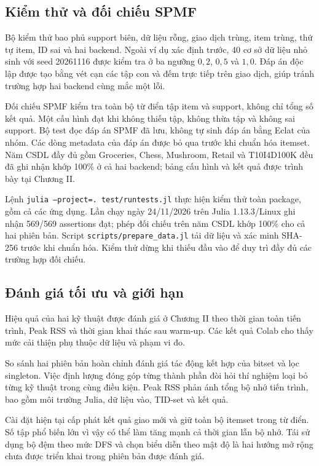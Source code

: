 \subsection{Kiểm thử và đối chiếu SPMF}
Bộ kiểm thử bao phủ support biên, dữ liệu rỗng, giao dịch trùng, item trùng, thứ tự item, ID sai và hai backend. Ngoài ví dụ xác định trước, 40 cơ sở dữ liệu nhỏ sinh với seed 20261116 được kiểm tra ở ba ngưỡng $0{,}2$, $0{,}5$ và $1{,}0$. Đáp án độc lập được tạo bằng vét cạn các tập con và đếm trực tiếp trên giao dịch, giúp tránh trường hợp hai backend cùng mắc một lỗi.

Đối chiếu SPMF kiểm tra toàn bộ từ điển tập item và support, không chỉ tổng số kết quả. Một cấu hình đạt khi không thiếu tập, không thừa tập và không sai support. Bộ test đọc đáp án SPMF đã lưu, không tự sinh đáp án bằng Eclat của nhóm. Các dòng metadata của đáp án được bỏ qua trước khi chuẩn hóa itemset. Năm CSDL đầy đủ gồm Groceries, Chess, Mushroom, Retail và T10I4D100K đều đã ghi nhận khớp 100\% ở cả hai backend; bảng cấu hình và kết quả được trình bày tại Chương II.

Lệnh \texttt{julia --project=. test/runtests.jl} thực hiện kiểm thử toàn package, gồm cả các ứng dụng. Lần chạy ngày 24/11/2026 trên Julia 1.13.3/Linux ghi nhận 569/569 assertions đạt; phép đối chiếu trên năm CSDL khớp 100\% cho cả hai phiên bản. Script \texttt{scripts/prepare\_data.jl} tải dữ liệu và xác minh SHA-256 trước khi chuẩn hóa. Kiểm thử dừng khi thiếu đầu vào để duy trì đầy đủ các trường hợp đối chiếu.

\subsection{Đánh giá tối ưu và giới hạn}
Hiệu quả của hai kỹ thuật được đánh giá ở Chương II theo thời gian toàn tiến trình, Peak RSS và thời gian khai thác sau warm-up. Các kết quả Colab cho thấy mức cải thiện phụ thuộc dữ liệu và phạm vi đo.

So sánh hai phiên bản hoàn chỉnh đánh giá tác động kết hợp của bitset và lọc singleton. Việc định lượng đóng góp từng thành phần đòi hỏi thí nghiệm loại bỏ từng kỹ thuật trong cùng điều kiện. Peak RSS phản ánh tổng bộ nhớ tiến trình, bao gồm môi trường Julia, dữ liệu vào, TID-set và kết quả.

Cài đặt hiện tại cấp phát kết quả giao mới và giữ toàn bộ itemset trong từ điển. Số tập phổ biến lớn vì vậy có thể làm tăng mạnh cả thời gian lẫn bộ nhớ. Tái sử dụng bộ đệm theo mức DFS và chọn biểu diễn theo mật độ là hai hướng mở rộng chưa được triển khai trong phiên bản được đánh giá.
